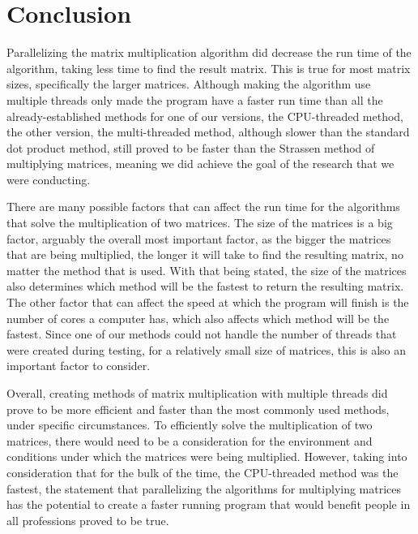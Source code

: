 \documentclass[conference]{IEEEtran}
\begin{document}
\section{Conclusion}
    Parallelizing the matrix multiplication algorithm did decrease the run time of the algorithm, taking less time to find the result matrix. This is true for most matrix sizes, specifically the larger matrices. Although making the algorithm use multiple threads only made the program have a faster run time than all the already-established methods for one of our versions, the CPU-threaded method, the other version, the multi-threaded method, although slower than the standard dot product method, still proved to be faster than the Strassen method of multiplying matrices, meaning we did achieve the goal of the research that we were conducting.

    There are many possible factors that can affect the run time for the algorithms that solve the multiplication of two matrices. The size of the matrices is a big factor, arguably the overall most important factor, as the bigger the matrices that are being multiplied, the longer it will take to find the resulting matrix, no matter the method that is used. With that being stated, the size of the matrices also determines which method will be the fastest to return the resulting matrix. The other factor that can affect the speed at which the program will finish is the number of cores a computer has, which also affects which method will be the fastest. Since one of our methods could not handle the number of threads that were created during testing, for a relatively small size of matrices, this is also an important factor to consider.
    
    Overall, creating methods of matrix multiplication with multiple threads did prove to be more efficient and faster than the most commonly used methods, under specific circumstances. To efficiently solve the multiplication of two matrices, there would need to be a consideration for the environment and conditions under which the matrices were being multiplied. However, taking into consideration that for the bulk of the time, the CPU-threaded method was the fastest, the statement that parallelizing the algorithms for multiplying matrices has the potential to create a faster running program that would benefit people in all professions proved to be true.

    
    
    
\end{document}
